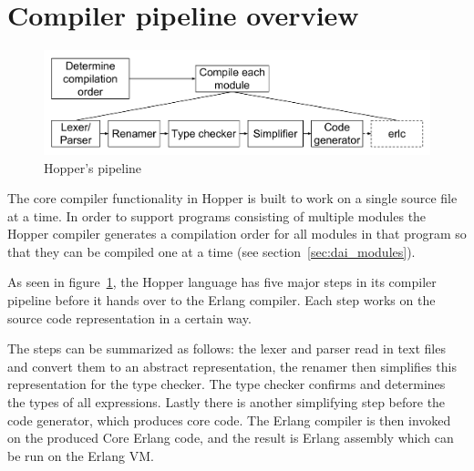 \section{Compiler pipeline overview}

\begin{figure}[h!]
\centering
  \includegraphics[width=0.6\pdfpagewidth]{figure/pipeline}
  \caption{Hopper's pipeline}
  \label{fig:pipeline}
\end{figure}

The core compiler functionality in Hopper is built to work on a single source file at a time. In order to support programs consisting of multiple modules the Hopper compiler generates a compilation order for all modules in that program so that they can be compiled one at a time (see section~\ref{sec:dai_modules}).

As seen in figure~\ref{fig:pipeline}, the Hopper language has five major steps in its compiler pipeline before it hands over to the Erlang compiler. Each step works on the source code representation in a certain way.

The steps can be summarized as follows: the lexer and parser read in text files and convert them to an abstract representation, the renamer then simplifies this representation for the type checker. The type checker confirms and determines the types of all expressions. Lastly there is another simplifying step before the code generator, which produces \gls{core} code. The Erlang compiler is then invoked on the produced Core Erlang code, and the result is Erlang assembly which can be run on the Erlang VM.
